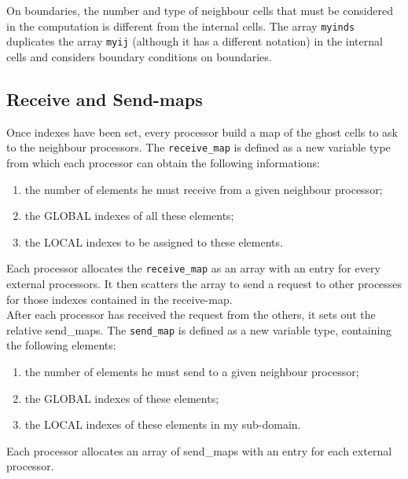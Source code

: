 On boundaries, the number and type of neighbour cells that must be considered
in the computation is different from the internal cells. The array
{\tt myinds} duplicates the array {\tt myij} (although it has a different notation)
in the internal cells and considers boundary conditions on boundaries.\\ 
%
\subsection{Receive and Send-maps}
%
Once indexes have been set, every processor build a map of the ghost cells
to ask to the neighbour processors. The {\tt receive\_map} is 
defined as a new variable type from which each processor can obtain the following informations:
\begin{enumerate}
\item the number of elements he must receive from a given neighbour processor;
\item the GLOBAL indexes of all these elements;
\item the LOCAL indexes to be assigned to these elements.
\end{enumerate}
Each processor allocates the {\tt receive\_map} as an array with an entry for every 
external processors. It then scatters the array to send a request to other 
processes for those indexes contained in the receive-map.\\
After each processor has received the request from the others,
it sets out the relative send\_maps. The {\tt send\_map} is defined as a new variable
type, containing the following elements:
\begin{enumerate}
\item the number of elements he must send to a given neighbour processor;
\item the GLOBAL indexes of these elements;
\item the LOCAL indexes of these elements in my sub-domain.
\end{enumerate}
Each processor allocates an array of send\_maps with an entry for each external processor.
%
